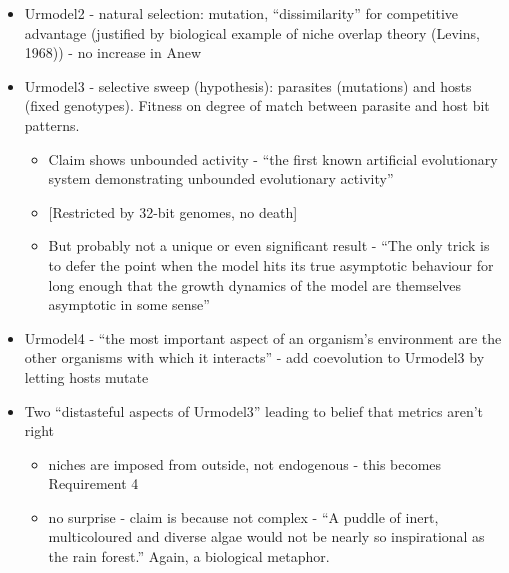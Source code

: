 \begin{itemize}
	\item
	
	Urmodel2 - natural selection: mutation, ``dissimilarity'' for
	competitive advantage (justified by biological example of niche
	overlap theory (Levins, 1968)) - no increase in Anew
	
	\item
	
	Urmodel3 - selective sweep (hypothesis): parasites (mutations) and
	hosts (fixed genotypes). Fitness on degree of match between parasite
	and host bit patterns.
	
	
	\begin{itemize}
		\item
		
		Claim shows unbounded activity - ``the first known artificial
		evolutionary system demonstrating unbounded evolutionary activity''
		
		\item
		
		{[}Restricted by 32-bit genomes, no death{]}
		
		\item
		
		But probably not a unique or even significant result - ``The only
		trick is to defer the point when the model hits its true asymptotic
		behaviour for long enough that the growth dynamics of the model are
		themselves asymptotic in some sense''
		
	\end{itemize}
	\item
	
	Urmodel4 - ``the most important aspect of an organism's environment
	are the other organisms with which it interacts'' - add coevolution to
	Urmodel3 by letting hosts mutate
	
	\item
	
	Two ``distasteful aspects of Urmodel3'' leading to belief that metrics
	aren't right
	
	
	\begin{itemize}
		\item
		
		niches are imposed from outside, not endogenous - this becomes
		Requirement 4
		
		\item
		
		no surprise - claim is because not complex - ``A puddle of inert,
		multicoloured and diverse algae would not be nearly so inspirational
		as the rain forest.'' Again, a biological metaphor.
		
	\end{itemize}
\end{itemize}

